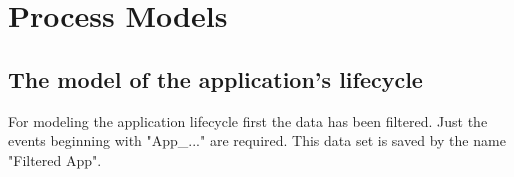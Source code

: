 \section{Process Models}

\subsection{The model of the application's lifecycle}
For modeling the application lifecycle first the data has been filtered. Just the events beginning with "App\_..." are required. This data set is saved by the name "Filtered App". 



